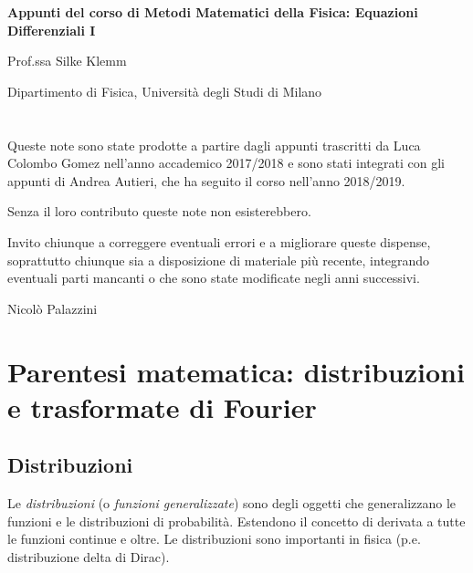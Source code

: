 \documentclass[a4paper,11pt]{report}
\begin{document}
\begin{titlepage}
\centering

\vspace*{\fill}

\Huge{\bf Appunti del corso di Metodi Matematici della Fisica: Equazioni Differenziali I}

\vspace*{\fill}

\LARGE{Prof.ssa Silke Klemm}

\vspace*{1cm}

\Large{Dipartimento di Fisica, Universit\`a degli Studi di Milano}

\end{titlepage}


\chapter*{}
Queste note sono state prodotte a partire dagli appunti trascritti da Luca Colombo Gomez nell'anno accademico 2017/2018 e sono stati integrati con gli appunti di Andrea Autieri, che ha seguito il corso nell'anno 2018/2019.

Senza il loro contributo queste note non esisterebbero.

Invito chiunque a correggere eventuali errori e a migliorare queste dispense, soprattutto chiunque sia a disposizione di materiale pi\`u recente, integrando eventuali parti mancanti o che sono state modificate negli anni successivi.

\begin{flushright} Nicol\`o Palazzini \end{flushright}

\tableofcontents

\chapter{Parentesi matematica: distribuzioni e trasformate di Fourier}


\section{Distribuzioni}

Le \emph{distribuzioni} (o \emph{funzioni generalizzate}) sono degli oggetti che generalizzano le funzioni e le distribuzioni di probabilit\`a.
Estendono il concetto di derivata a tutte le funzioni continue e oltre.
Le distribuzioni sono importanti in fisica (p.e. distribuzione delta di Dirac).
\end{document}

